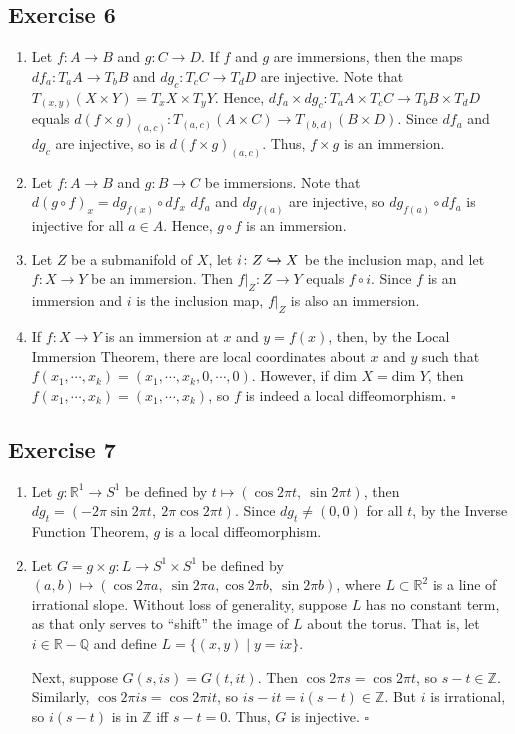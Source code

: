 \documentclass{article}
\newcommand{\Z}{\mathbb{Z}}
\newcommand{\Q}{\mathbb{Q}}
\newcommand{\R}{\mathbb{R}}
\begin{document}
\subsection*{Exercise 6}
\begin{enumerate}[label=(\alph*)]
\item{
	Let $f\colon A\to B$ and $g\colon C\to D$.
	If $f$ and $g$ are immersions, then the maps
	$df_a\colon T_aA\to T_bB$ and $dg_c\colon T_cC\to T_dD$
	are injective.
	Note that $T_{(x,y)}(X\times Y)=T_xX\times T_yY$.
	Hence, $df_a\times dg_c\colon
		T_aA\times T_cC\to T_bB\times T_dD$
	equals $d(f\times g)_{(a,c)}\colon
		T_{(a,c)}(A\times C)\to T_{(b,d)}(B\times D)$.
	Since $df_a$ and $dg_c$ are injective, so is
	$d(f\times g)_{(a,c)}$.
	Thus, $f\times g$ is an immersion.
}
\item{
	Let $f\colon A\to B$ and $g\colon B\to C$ be immersions.
	Note that $d(g\circ f)_x=dg_{f(x)}\circ df_x$
	$df_a$ and $dg_{f(a)}$ are injective, so $dg_{f(a)}\circ df_a$
	is injective for all $a\in A$.
	Hence, $g\circ f$ is an immersion.
}
\item{
	Let $Z$ be a submanifold of $X$, let
	$i\colon Z\xhookrightarrow{} X$ be the inclusion map,
	and let $f\colon X\to Y$ be an immersion.
	Then $f|_Z\colon Z\to Y$ equals $f\circ i$.
	Since $f$ is an immersion and $i$ is the inclusion map,
	$f|_Z$ is also an immersion.
}
\item{
	If $f\colon X\to Y$ is an immersion at $x$ and $y=f(x)$,
	then, by the Local Immersion Theorem, there are local
	coordinates about $x$ and $y$ such that
	$f(x_1,\cdots,x_k)=(x_1,\cdots,x_k,0,\cdots,0)$.
	However, if $\text{dim }X=\text{dim }Y$, then
	$f(x_1,\cdots,x_k)=(x_1,\cdots,x_k)$, so $f$ is indeed
	a  local diffeomorphism.
}
\hfill $\square$
\end{enumerate}

\subsection*{Exercise 7}
\begin{enumerate}[label=(\alph*)]
\item{
	Let $g\colon\R^1\to S^1$ be defined by
	$t\mapsto(\cos2\pi t,\ \sin2\pi t)$, then
	$dg_t = (-2\pi\sin2\pi t,\ 2\pi\cos2\pi t)$.
	Since $dg_t\ne(0,0)$ for all $t$, by the
	Inverse Function Theorem, $g$ is a local
	diffeomorphism.
}
\item{
	Let $G=g\times g\colon L\to S^1\times S^1$
	be defined by $(a,b)\mapsto(\cos2\pi a,\ \sin2\pi a,
	\cos2\pi b,\ \sin2\pi b)$, where $L\subset\R^2$
	is a line of irrational slope. Without loss of generality,
	suppose $L$ has no constant term, as that only serves to ``shift''
	the image of $L$ about the torus. That is, let $i\in\R-\Q$
	and define $L=\{(x,y)\mid y=ix\}$.
	
	Next, suppose $G(s,is)=G(t,it)$. Then $\cos2\pi s=\cos2\pi t$,
	so $s-t\in\Z$. Similarly, $\cos2\pi is=\cos2\pi it$,
	so $is-it=i(s-t)\in\Z$. But $i$ is irrational, so
	$i(s-t)$ is in $\Z$ iff $s-t=0$. Thus, $G$ is injective.
	\hfill $\square$
}
\end{enumerate}
\end{document}
